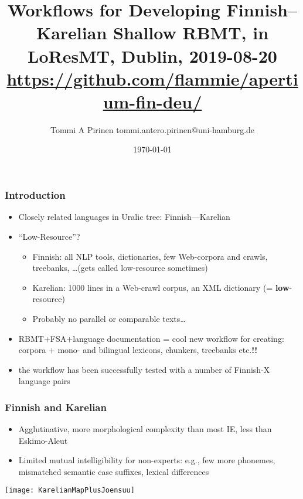 \documentclass{beamer}
\title{Workflows for Developing Finnish–Karelian Shallow RBMT,
\scriptsize{in LoResMT, Dublin, 2019-08-20\\
\url{https://github.com/flammie/apertium-fin-deu/}}}
\author{Tommi A Pirinen \scriptsize \guilsinglleft tommi.antero.pirinen@uni-hamburg.de \guilsinglright }
\institute{Universität Hamburg}
\date{\today}
\newcommand{\hand}{\ding{43}}
\begin{document}

\maketitle

\begin{frame}
    \frametitle{Introduction}
    \begin{itemize}
        \item Closely related languages in Uralic tree: Finnish---Karelian
        \item ``Low-Resource''?\begin{itemize}
                \item Finnish: all NLP tools, dictionaries, few Web-corpora and
                    crawls, treebanks, \ldots (gets called low-resource
                    sometimes)
                \item Karelian: 1000 lines in a Web-crawl corpus,
                    an XML dictionary (= \textbf{low}-resource)
                \item Probably no parallel or comparable texts\ldots
        \end{itemize}
        \item \hand RBMT+FSA+language documentation =
            cool new workflow for creating: corpora + mono- and bilingual
            lexicons, chunkers, treebanks etc.\textbf{!!}
        \item the workflow has been successfully tested with a number of
            Finnish-X language pairs
    \end{itemize}
\end{frame}

\begin{frame}
    \frametitle{Finnish and Karelian}
    \parbox{.6\textwidth}{%
    \begin{itemize}
        \item Agglutinative, more morphological complexity than most IE, less
            than Eskimo-Aleut
        \item Limited mutual intelligibility for non-experts: e.g., few more
            phonemes, mismatched semantic case suffixes, lexical differences
    \end{itemize}
    }\hfill\parbox{.4\textwidth}{%
        \texttt{[image: KarelianMapPlusJoensuu]}
    }
\end{frame}
\end{document}
